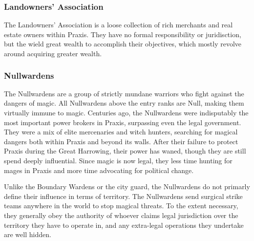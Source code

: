         \subsubsection{Landowners' Association}
            The Landowners' Association is a loose collection of rich merchants and real estate owners within Praxis.
            They have no formal responsibility or juridisction, but the wield great wealth to accomplish their objectives, which mostly revolve around acquiring greater wealth.

        \subsubsection{Nullwardens}
            The Nullwardens are a group of strictly mundane warriors who fight against the dangers of magic.
            All Nullwardens above the entry ranks are Null, making them virtually immune to magic.
            Centuries ago, the Nullwardens were indisputably the most important power brokers in Praxis, surpassing even the legal government.
            They were a mix of elite mercenaries and witch hunters, searching for magical dangers both within Praxis and beyond its walls.
            After their failure to protect Praxis during the Great Harrowing, their power has waned, though they are still spend deeply influential.
            Since magic is now legal, they less time hunting for mages in Praxis and more time advocating for political change.

            Unlike the Boundary Wardens or the city guard, the Nullwardens do not primarly define their influence in terms of territory.
            The Nullwardens send surgical strike teams anywhere in the world to stop magical threats.
            To the extent necessary, they generally obey the authority of whoever claims legal jurisdiction over the territory they have to operate in, and any extra-legal operations they undertake are well hidden.
